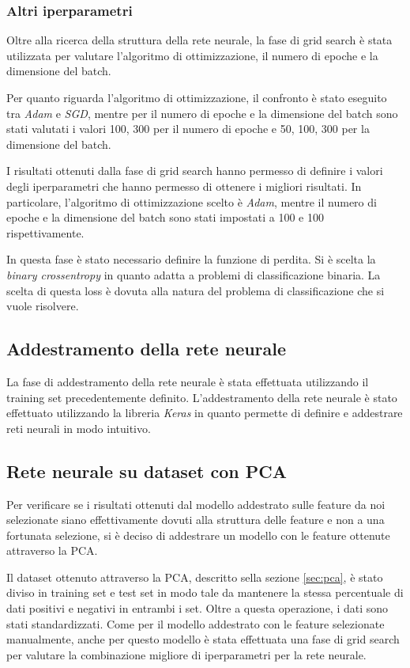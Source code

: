 \subsubsection{Altri iperparametri}
Oltre alla ricerca della struttura della rete neurale, la fase di grid search è
stata utilizzata per valutare l'algoritmo di ottimizzazione, il numero di epoche
e la dimensione del batch.

Per quanto riguarda l'algoritmo di ottimizzazione, il confronto è stato eseguito
tra \textit{Adam} e \textit{SGD}, mentre per il numero di epoche e la dimensione
del batch sono stati valutati i valori 100, 300 per il numero di epoche e 50,
100, 300 per la dimensione del batch.

I risultati ottenuti dalla fase di grid search hanno permesso di definire i valori
degli iperparametri che hanno permesso di ottenere i migliori risultati. In
particolare, l'algoritmo di ottimizzazione scelto è \textit{Adam}, mentre il
numero di epoche e la dimensione del batch sono stati impostati a 100 e 100
rispettivamente.

In questa fase è stato necessario definire la funzione di perdita. Si è scelta
la \textit{binary crossentropy} in quanto adatta a problemi di classificazione
binaria. La scelta di questa loss è dovuta alla natura del problema di
classificazione che si vuole risolvere.
\subsection{Addestramento della rete neurale}
La fase di addestramento della rete neurale è stata effettuata utilizzando il
training set precedentemente definito. L'addestramento della rete neurale è stato
effettuato utilizzando la libreria \textit{Keras} in quanto permette di definire
e addestrare reti neurali in modo intuitivo.
\subsection{Rete neurale su dataset con PCA}
Per verificare se i risultati ottenuti dal modello addestrato sulle feature da
noi selezionate siano effettivamente dovuti alla struttura delle feature e non
a una fortunata selezione, si è deciso di addestrare un modello con le feature
ottenute attraverso la PCA.

Il dataset ottenuto attraverso la PCA, descritto sella sezione \ref{sec:pca}, è
stato diviso in training set e test set in modo tale da mantenere la stessa
percentuale di dati positivi e negativi in entrambi i set. Oltre a questa
operazione, i dati sono stati standardizzati.
Come per il modello addestrato con le feature selezionate manualmente, anche per
questo modello è stata effettuata una fase di grid search per valutare la
combinazione migliore di iperparametri per la rete neurale.

